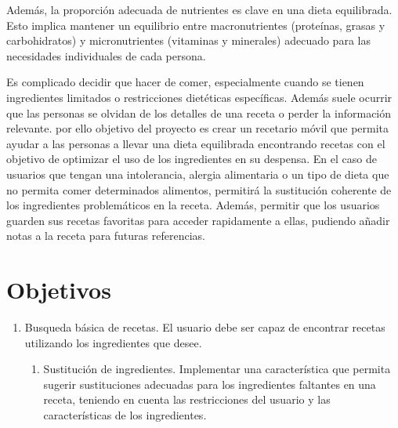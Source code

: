 Además, la proporción adecuada de nutrientes es clave en una dieta equilibrada. Esto implica mantener un equilibrio entre macronutrientes (proteínas, grasas y carbohidratos) y micronutrientes (vitaminas y minerales) adecuado para las necesidades individuales de cada persona.

Es complicado decidir que hacer de comer, especialmente cuando se tienen ingredientes limitados o restricciones dietéticas específicas. Además suele ocurrir que las personas se olvidan de los detalles de una receta o perder la información relevante. por ello objetivo del proyecto es crear un recetario móvil que permita ayudar a las personas a llevar una dieta equilibrada encontrando recetas con el objetivo de optimizar el uso de los ingredientes en su despensa. En el caso de usuarios que tengan una intolerancia, alergia alimentaria o un tipo de dieta que no permita comer determinados alimentos, permitirá la sustitución coherente de los ingredientes problemáticos en la receta. Además, permitir que los usuarios guarden sus recetas favoritas para acceder rapidamente a ellas, pudiendo añadir notas a la receta para futuras referencias.

\section{Objetivos}
\begin{enumerate} 
    \item Busqueda básica de recetas. El usuario debe ser capaz de encontrar recetas utilizando los ingredientes que desee.
    \begin{enumerate}
        \item Sustitución de ingredientes. Implementar una característica que permita sugerir sustituciones adecuadas para los ingredientes faltantes en una receta, teniendo en cuenta las restricciones del usuario y las características de los ingredientes.
    \end{enumerate}
\end{enumerate}